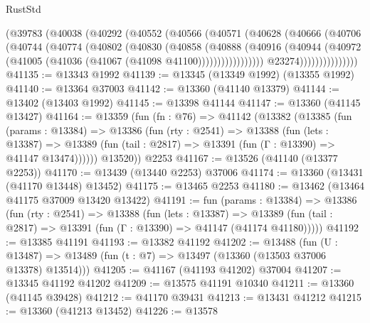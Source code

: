 \begin{lexlean}{RustStd}
\begin{coremodule}
                        (@39783
                          (@40038
                            (@40292
                              (@40552
                                (@40566
                                  (@40571
                                    (@40628
                                      (@40666
                                        (@40706
                                          (@40744
                                            (@40774
                                              (@40802
                                                (@40830
                                                  (@40858
                                                    (@40888
                                                      (@40916
                                                        (@40944
                                                          (@40972
                                                            (@41005
                                                              (@41036
                                                                (@41067
                                                                  (@41098 @41100)))))))))))))))))
                                  @23274)))))))))))))))
@41135 := @13343 @1992
@41139 := @13345 (@13349 @1992) (@13355 @1992)
@41140 := @13364 @37003
@41142 := @13360 (@41140 @13379)
@41144 := @13402 (@13403 @1992)
@41145 := @13398 @41144
@41147 := @13360 (@41145 @13427)
@41164 := @13359
    (fun (fn : @76) =>
    @41142
      (@13382
        (@13385
          (fun (params : @13384) =>
          @13386
            (fun (rty : @2541) =>
            @13388
              (fun (lets : @13387) =>
              @13389 (fun (tail : @2817) => @13391 (fun (Γ : @13390) => @41147 @13474))))))
        @13520))
    @2253
@41167 := @13526 (@41140 (@13377 @2253))
@41170 := @13439 (@13440 @2253) @37006
@41174 := @13360 (@13431 (@41170 @13448) @13452)
@41175 := @13465 @2253
@41180 := @13462 (@13464 @41175 @37009 @13420 @13422)
@41191 := fun (params : @13384) =>
  @13386
    (fun (rty : @2541) =>
    @13388
      (fun (lets : @13387) =>
      @13389 (fun (tail : @2817) => @13391 (fun (Γ : @13390) => @41147 (@41174 @41180)))))
@41192 := @13385 @41191
@41193 := @13382 @41192
@41202 := @13488
    (fun (U : @13487) => @13489 (fun (t : @7) => @13497 (@13360 (@13503 @37006 @13378) @13514)))
@41205 := @41167 (@41193 @41202) @37004
@41207 := @13345 @41192 @41202
@41209 := @13575 @41191 @10340
@41211 := @13360 (@41145 @39428)
@41212 := @41170 @39431
@41213 := @13431 @41212
@41215 := @13360 (@41213 @13452)
@41226 := @13578

\end{coremodule}
\end{lexlean}
